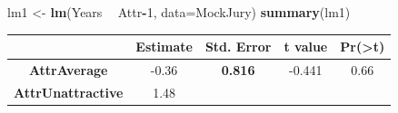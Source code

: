 \documentclass[]{book}
\newenvironment{Shaded}{\begin{snugshade}}{\end{snugshade}}
\newcommand{\KeywordTok}[1]{\textcolor[rgb]{0.13,0.29,0.53}{\textbf{#1}}}
\newcommand{\DataTypeTok}[1]{\textcolor[rgb]{0.13,0.29,0.53}{#1}}
\newcommand{\DecValTok}[1]{\textcolor[rgb]{0.00,0.00,0.81}{#1}}
\newcommand{\StringTok}[1]{\textcolor[rgb]{0.31,0.60,0.02}{#1}}
\newcommand{\OperatorTok}[1]{\textcolor[rgb]{0.81,0.36,0.00}{\textbf{#1}}}
\newcommand{\NormalTok}[1]{#1}
\begin{document}
\begin{Shaded}
\begin{Highlighting}[]
\NormalTok{lm1 <-}\StringTok{ }\KeywordTok{lm}\NormalTok{(Years }\OperatorTok{~}\StringTok{ }\NormalTok{Attr}\OperatorTok{-}\DecValTok{1}\NormalTok{, }\DataTypeTok{data=}\NormalTok{MockJury)}
\KeywordTok{summary}\NormalTok{(lm1)}
\end{Highlighting}
\end{Shaded}

\begin{longtable}[]{@{}ccccc@{}}
\toprule
\begin{minipage}[b]{0.27\columnwidth}\centering\strut
~\strut
\end{minipage} & \begin{minipage}[b]{0.13\columnwidth}\centering\strut
Estimate\strut
\end{minipage} & \begin{minipage}[b]{0.16\columnwidth}\centering\strut
Std. Error\strut
\end{minipage} & \begin{minipage}[b]{0.12\columnwidth}\centering\strut
t value\strut
\end{minipage} & \begin{minipage}[b]{0.12\columnwidth}\centering\strut
Pr(\textgreater{}\textbar{}t\textbar{})\strut
\end{minipage}\tabularnewline
\midrule
\endhead
\begin{minipage}[t]{0.27\columnwidth}\centering\strut
\textbf{AttrAverage}\strut
\end{minipage} & \begin{minipage}[t]{0.13\columnwidth}\centering\strut
-0.36\strut
\end{minipage} & \begin{minipage}[t]{0.16\columnwidth}\centering\strut
\textbf{0.816}\strut
\end{minipage} & \begin{minipage}[t]{0.12\columnwidth}\centering\strut
-0.441\strut
\end{minipage} & \begin{minipage}[t]{0.12\columnwidth}\centering\strut
0.66\strut
\end{minipage}\tabularnewline
\begin{minipage}[t]{0.27\columnwidth}\centering\strut
\textbf{AttrUnattractive}\strut
\end{minipage} & \begin{minipage}[t]{0.13\columnwidth}\centering\strut
1.48\strut

\end{minipage}
\end{longtable}
\end{document}
